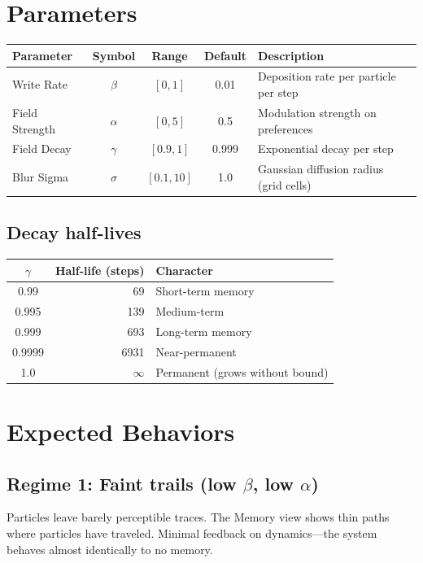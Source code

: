 \documentclass[11pt,a4paper]{article}
\begin{document}
\section{Parameters}

\begin{tabular}{lcccp{6cm}}
\toprule
\textbf{Parameter} & \textbf{Symbol} & \textbf{Range} & \textbf{Default} & \textbf{Description} \\
\midrule
Write Rate & $\beta$ & $[0, 1]$ & 0.01 & Deposition rate per particle per step \\
Field Strength & $\alpha$ & $[0, 5]$ & 0.5 & Modulation strength on preferences \\
Field Decay & $\gamma$ & $[0.9, 1]$ & 0.999 & Exponential decay per step \\
Blur Sigma & $\sigma$ & $[0.1, 10]$ & 1.0 & Gaussian diffusion radius (grid cells) \\
\bottomrule
\end{tabular}

\subsection{Decay half-lives}

\begin{tabular}{crl}
\toprule
$\gamma$ & \textbf{Half-life (steps)} & \textbf{Character} \\
\midrule
0.99 & 69 & Short-term memory \\
0.995 & 139 & Medium-term \\
0.999 & 693 & Long-term memory \\
0.9999 & 6931 & Near-permanent \\
1.0 & $\infty$ & Permanent (grows without bound) \\
\bottomrule
\end{tabular}

\section{Expected Behaviors}

\subsection{Regime 1: Faint trails (low $\beta$, low $\alpha$)}

Particles leave barely perceptible traces. The Memory view shows thin paths where particles have traveled. Minimal feedback on dynamics---the system behaves almost identically to no memory.
\end{document}
